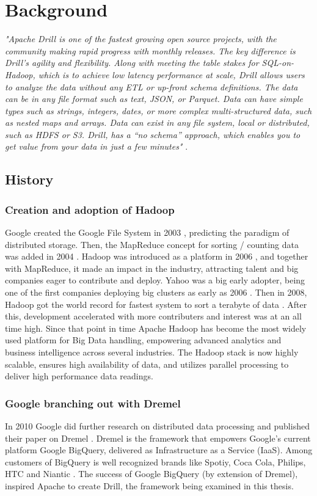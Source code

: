 \documentclass[a4paper,english]{report}
\begin{document}
	\chapter{Background}
	\emph{"Apache Drill is one of the fastest growing open source projects, with the community making rapid progress with monthly releases. The key difference is Drill’s agility and flexibility. Along with meeting the table stakes for SQL-on-Hadoop, which is to achieve low latency performance at scale, Drill allows users to analyze the data without any ETL or up-front schema definitions. The data can be in any file format such as text, JSON, or Parquet. Data can have simple types such as strings, integers, dates, or more complex multi-structured data, such as nested maps and arrays. Data can exist in any file system, local or distributed, such as HDFS or S3. Drill, has a “no schema” approach, which enables you to get value from your data in just a few minutes"} \cite{drill}.
	
	\section{History}
		\subsection{Creation and adoption of Hadoop}
		Google created the Google File System in 2003 \cite{gfs}, predicting the paradigm of distributed storage. Then, the MapReduce concept for sorting / counting data was added in 2004 \cite{mapredoriginal}. Hadoop was introduced as a platform in 2006 \cite{hadoopguide}, and together with MapReduce, it made an impact in the industry, attracting talent and big companies eager to contribute and deploy. Yahoo was a big early adopter, being one of the first companies deploying big clusters as early as 2006 \cite{hadoopguide}. Then in 2008, Hadoop got the world record for fastest system to sort a terabyte of data \cite{hadoopguide}. After this, development accelerated with more contributers and interest was at an all time high. Since that point in time Apache Hadoop has become the most widely used platform for Big Data handling, empowering advanced analytics and business intelligence across several industries. The Hadoop stack is now highly scalable, ensures high availability of data, and utilizes parallel processing to deliver high performance data readings.
		
		\subsection{Google branching out with Dremel}
		In 2010 Google did further research on distributed data processing and published their paper on Dremel \cite{dremel}. Dremel is the framework that empowers Google's current platform Google BigQuery, delivered as Infrastructure as a Service (IaaS). Among customers of BigQuery is well recognized brands like Spotiy, Coca Cola, Philips, HTC and Niantic \cite{dremelcustomers}. The success of Google BigQuery (by extension of Dremel), inspired Apache to create Drill, the framework being examined in this thesis.
	
\end{document}
